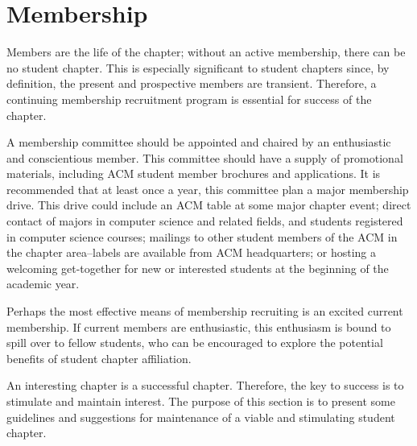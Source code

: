 \section{Membership}

Members are the life of the chapter; without an active membership, there can be no student chapter. This is especially significant to student chapters since, by definition, the present and prospective members are transient. Therefore, a continuing membership recruitment program is essential for success of the chapter.

A membership committee should be appointed and chaired by an enthusiastic and conscientious member. This committee should have a supply of promotional materials, including ACM student member brochures and applications. It is recommended that at least once a year, this committee plan a major membership drive. This drive could include an ACM table at some major chapter event; direct contact of majors in computer science and related fields, and students registered in computer science courses; mailings to other student members of the ACM in the chapter area--labels are available from ACM headquarters; or hosting a welcoming get-together for new or interested students at the beginning of the academic year.

Perhaps the most effective means of membership recruiting is an excited current membership. If current members are enthusiastic, this enthusiasm is bound to spill over to fellow students, who can be encouraged to explore the potential benefits of student chapter affiliation.

An interesting chapter is a successful chapter. Therefore, the key to success is to stimulate and maintain interest. The purpose of this section is to present some guidelines and suggestions for maintenance of a viable and stimulating student chapter.

